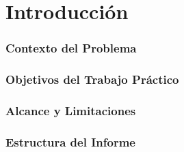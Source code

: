 \section{Introducción}
\subsubsection*{Contexto del Problema}
\subsubsection*{Objetivos del Trabajo Práctico}
\subsubsection*{Alcance y Limitaciones}
\subsubsection*{Estructura del Informe}